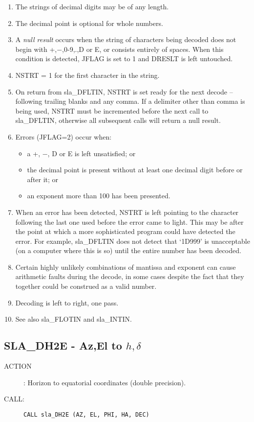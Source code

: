 \documentclass[11pt,twoside]{article}
\newcommand{\xlabel}[1]{}
\newcommand{\routine}[3]
{\hbadness=10000
  \vbox
  {
    \rule{\textwidth}{0.3mm}\\
    {\Large {\bf #1} \hfill #2 \hfill {\bf #1}}\\
    \setlength{\oldspacing}{\topsep}
    \setlength{\topsep}{0.3ex}
    \begin{description}
      #3
    \end{description}
    \setlength{\topsep}{\oldspacing}
  }
}
\renewcommand{\routine}[3]
   {
      \subsection{#1\xlabel{#1} - #2\label{#1}}
       \begin{description}
         #3
       \end{description}
   }
\newcommand{\action}[1]
{\item[ACTION]: #1}
\newcommand{\action}[1]
   {\item[ACTION:] #1}
\newcommand{\call}[1]
{\item[CALL]: \hspace{0.4em}{\tt #1}}
\newlength{\oldspacing}
\renewcommand{\call}[1]
   {
    \item[CALL:] {\tt #1}
   }
\begin{document}
{\begin{enumerate}
 \item The strings of decimal digits may be of any length.
 \item The decimal point is optional for whole numbers.
 \item A {\it null result}\/ occurs when the string of characters
       being decoded does not begin with +,$-$,0-9,.,D or E, or
       consists entirely of spaces.  When this condition is
       detected, JFLAG is set to 1 and DRESLT is left untouched.
 \item NSTRT = 1 for the first character in the string.
 \item On return from sla\_DFLTIN, NSTRT is set ready for the next
       decode -- following trailing blanks and any comma.  If a
       delimiter other than comma is being used, NSTRT must be
       incremented before the next call to sla\_DFLTIN, otherwise
       all subsequent calls will return a null result.
 \item Errors (JFLAG=2) occur when:
       \begin{itemize}
       \item a +, $-$, D or E is left unsatisfied; or
       \item the decimal point is present without at least
             one decimal digit before or after it; or
       \item an exponent more than 100 has been presented.
       \end{itemize}
 \item When an error has been detected, NSTRT is left
       pointing to the character following the last
       one used before the error came to light.  This
       may be after the point at which a more sophisticated
       program could have detected the error.  For example,
       sla\_DFLTIN does not detect that `1D999' is unacceptable
       (on a computer where this is so) until the entire number
       has been decoded.
 \item Certain highly unlikely combinations of mantissa and
       exponent can cause arithmetic faults during the
       decode, in some cases despite the fact that they
       together could be construed as a valid number.
 \item Decoding is left to right, one pass.
 \item See also sla\_FLOTIN and sla\_INTIN.
 \end{enumerate}
}
\routine{SLA\_DH2E}{Az,El to $h,\delta$}
{
 \action{Horizon to equatorial coordinates
         (double precision).}
 \call{CALL sla\_DH2E (AZ, EL, PHI, HA, DEC)}
}
\end{document}
